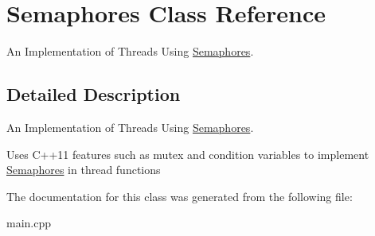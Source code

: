 \hypertarget{class_semaphores}{}\section{Semaphores Class Reference}
\label{class_semaphores}


An Implementation of Threads Using \hyperlink{class_semaphores}{Semaphores}.  




\subsection{Detailed Description}
An Implementation of Threads Using \hyperlink{class_semaphores}{Semaphores}. 

Uses C++11 features such as mutex and condition variables to implement \hyperlink{class_semaphores}{Semaphores} in thread functions 

The documentation for this class was generated from the following file\+:\begin{DoxyCompactItemize}
\item 
main.\+cpp\end{DoxyCompactItemize}
